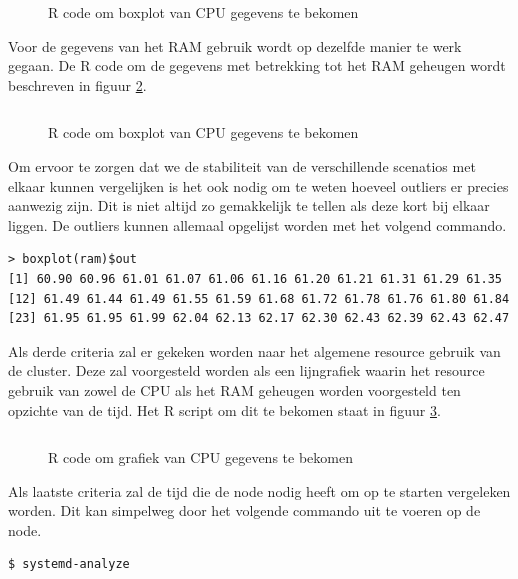 \begin{figure}[h] 
	\inputminted[fontsize=\footnotesize,linenos]{R}{files/dataCpuBox.R}
	\caption{R code om boxplot van CPU gegevens te bekomen}
	\label{CPUBox}
\end{figure}
%

Voor de gegevens van het RAM gebruik wordt op dezelfde manier te werk gegaan. De R code om de gegevens met betrekking tot het RAM geheugen wordt beschreven in figuur \ref{RAMBox}.
\begin{figure}[h] 
	\inputminted[fontsize=\footnotesize,linenos]{R}{files/dataRAMBox.R}
	\caption{R code om boxplot van CPU gegevens te bekomen}
	\label{RAMBox}
\end{figure}

Om ervoor te zorgen dat we de stabiliteit van de verschillende scenatios met elkaar kunnen vergelijken is het ook nodig om te weten hoeveel outliers er precies aanwezig zijn. Dit is niet altijd zo gemakkelijk te tellen als deze kort bij elkaar liggen. De outliers kunnen allemaal opgelijst worden met het volgend commando.
\begin{verbatim} 
> boxplot(ram)$out
[1] 60.90 60.96 61.01 61.07 61.06 61.16 61.20 61.21 61.31 61.29 61.35
[12] 61.49 61.44 61.49 61.55 61.59 61.68 61.72 61.78 61.76 61.80 61.84
[23] 61.95 61.95 61.99 62.04 62.13 62.17 62.30 62.43 62.39 62.43 62.47
\end{verbatim}

Als derde criteria zal er gekeken worden naar het algemene resource gebruik van de cluster. Deze zal voorgesteld worden als een lijngrafiek waarin het resource gebruik van zowel de CPU als het RAM geheugen worden voorgesteld ten opzichte van de tijd. Het R script om dit te bekomen staat in figuur \ref{CPUGraph}. 
\begin{figure}[h] 
	\inputminted[fontsize=\footnotesize,linenos]{R}{files/dataCpuGraph.R}
	\caption{R code om grafiek van CPU gegevens te bekomen}
	\label{CPUGraph}
\end{figure}

Als laatste criteria zal de tijd die de node nodig heeft om op te starten vergeleken worden. Dit kan simpelweg door het volgende commando uit te voeren op de node.
\begin{verbatim} 
$ systemd-analyze
\end{verbatim}

